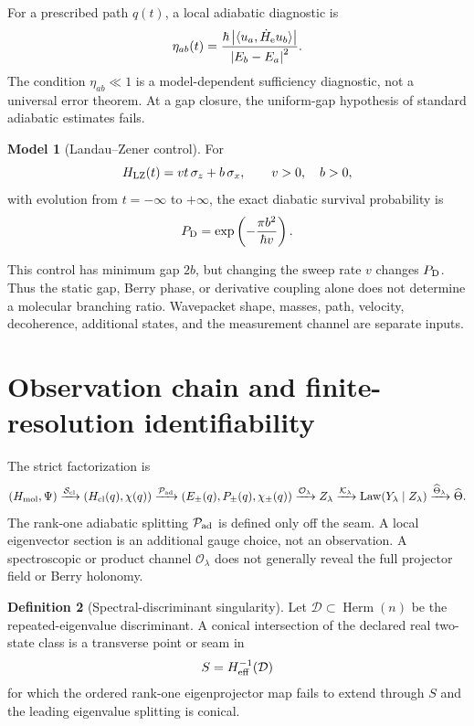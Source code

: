 \documentclass[11pt,a4paper]{article}
\theoremstyle{definition}
\newtheorem{definition}{Definition}[section]
\newtheorem{model}[definition]{Model}
\theoremstyle{plain}
\theoremstyle{remark}
\newcommand{\abs}[1]{\left\lvert #1\right\rvert}
\newcommand{\Ocal}{\mathcal O}
\newcommand{\Kcal}{\mathcal K}
\newcommand{\Pcal}{\mathcal P}
\newcommand{\Scal}{\mathcal S}
\newcommand{\Dcal}{\mathcal D}
\newcommand{\Law}{\operatorname{Law}}
\begin{document}
For a prescribed path \(q(t)\), a local adiabatic diagnostic is
\begin{equation}\label{eq:adiabatic-parameter}
\eta_{ab}(t)
=\frac{\hbar\abs{\langle u_a,\dot H_{\rm e}u_b\rangle}}
{\abs{E_b-E_a}^2}.
\end{equation}
The condition \(\eta_{ab}\ll1\) is a model-dependent sufficiency
diagnostic, not a universal error theorem. At a gap closure, the
uniform-gap hypothesis of standard adiabatic estimates fails.

\begin{model}[Landau--Zener control]\label{model:lz}
For
\[
H_{\rm LZ}(t)=vt\,\sigma_z+b\,\sigma_x,\qquad
v>0,\quad b>0,
\]
with evolution from \(t=-\infty\) to \(+\infty\), the exact diabatic
survival probability is
\begin{equation}\label{eq:lz}
P_{\rm D}=\exp\left(-\frac{\pi b^2}{\hbar v}\right).
\end{equation}
\end{model}

This control has minimum gap \(2b\), but changing the sweep rate \(v\)
changes \(P_{\rm D}\). Thus the static gap, Berry phase, or derivative
coupling alone does not determine a molecular branching ratio.
Wavepacket shape, masses, path, velocity, decoherence, additional
states, and the measurement channel are separate inputs.

\section{Observation chain and finite-resolution identifiability}

The strict factorization is
\begin{equation}\label{eq:observation-chain}
(H_{\rm mol},\Psi)
\xrightarrow{\Scal_{\rm cl}}
(H_{\rm cl}(q),\chi(q))
\xrightarrow{\Pcal_{\rm ad}}
(E_\pm(q),P_\pm(q),\chi_\pm(q))
\xrightarrow{\Ocal_\lambda}
Z_\lambda
\xrightarrow{\Kcal_\lambda}
\Law(Y_\lambda\mid Z_\lambda)
\xrightarrow{\widehat\Theta_\lambda}
\widehat\Theta .
\end{equation}
The rank-one adiabatic splitting \(\Pcal_{\rm ad}\) is defined only
off the seam. A local eigenvector section is an additional gauge
choice, not an observation.  A spectroscopic or product channel
\(\Ocal_\lambda\) does not generally reveal the full projector field
or Berry holonomy.

\begin{definition}[Spectral-discriminant singularity]
Let \(\Dcal\subset\operatorname{Herm}(n)\) be the repeated-eigenvalue
discriminant. A conical intersection of the declared real two-state
class is a transverse point or seam in
\[
S=H_{\rm eff}^{-1}(\Dcal)
\]
for which the ordered rank-one eigenprojector map fails to extend
through \(S\) and the leading eigenvalue splitting is conical.
\end{definition}
\end{document}
